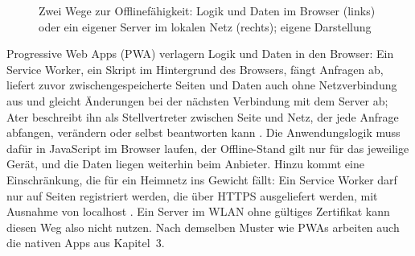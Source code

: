 \documentclass[12pt,a4paper]{scrreprt}
\begin{document}
\begin{figure}[!htb]
    \centering
    \caption{Zwei Wege zur Offlinefähigkeit: Logik und Daten im Browser (links) oder ein eigener Server im lokalen Netz (rechts); eigene Darstellung}
    \label{fig:offline}
\end{figure}

Progressive Web Apps (PWA) verlagern Logik und Daten in den Browser: Ein Service Worker, ein Skript im Hintergrund des Browsers, fängt Anfragen ab, liefert zuvor zwischengespeicherte Seiten und Daten auch ohne Netzverbindung aus und gleicht Änderungen bei der nächsten Verbindung mit dem Server ab; Ater beschreibt ihn als Stellvertreter zwischen Seite und Netz, der jede Anfrage abfangen, verändern oder selbst beantworten kann \cite[Kap.~2]{ater2017, mdnpwa}. Die Anwendungslogik muss dafür in JavaScript im Browser laufen, der Offline-Stand gilt nur für das jeweilige Gerät, und die Daten liegen weiterhin beim Anbieter. Hinzu kommt eine Einschränkung, die für ein Heimnetz ins Gewicht fällt: Ein Service Worker darf nur auf Seiten registriert werden, die über HTTPS ausgeliefert werden, mit Ausnahme von localhost \cite[Kap.~2]{ater2017}. Ein Server im WLAN ohne gültiges Zertifikat kann diesen Weg also nicht nutzen. Nach demselben Muster wie PWAs arbeiten auch die nativen Apps aus Kapitel~3.
\end{document}
